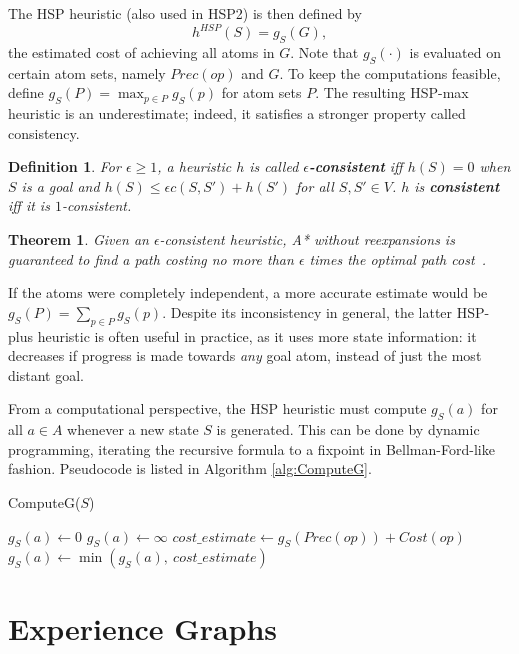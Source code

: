 \documentclass[letterpaper]{article}
\newtheorem{thm}{Theorem}
\newtheorem{defn}{Definition}
\begin{document}
The HSP heuristic (also used in HSP2) is then defined by
\[h^{HSP}(S) = g_S(G),\]
the estimated cost of achieving all atoms in $G$. Note that $g_S(\cdot)$ is evaluated on certain atom sets, namely $Prec(op)$ and $G$.
To keep the computations feasible, define $g_S(P) = \max_{p\in P} g_S(p)$ for atom sets $P$.
The resulting HSP-max heuristic is an underestimate; indeed, it satisfies a stronger property called consistency.

\begin{defn} For $\epsilon\ge 1$, a heuristic $h$ is called \textbf{$\epsilon$-consistent} iff $h(S) = 0$ when $S$ is a goal and $h(S) \le \epsilon c(S,S') + h(S')$ for all $S,S'\in V$. $h$ is \textbf{consistent} iff it is $1$-consistent. \end{defn}
\begin{thm} Given an $\epsilon$-consistent heuristic, A* without reexpansions is guaranteed to find a path costing no more than $\epsilon$ times the optimal path cost~\cite{LikGorThr-ara}. \end{thm}

If the atoms were completely independent, a more accurate estimate would be $g_S(P) = \sum_{p\in P} g_S(p)$.
Despite its inconsistency in general, the latter HSP-plus heuristic is often useful in practice, as it uses more state information: it decreases if progress is made towards \textit{any} goal atom, instead of just the most distant goal.

From a computational perspective, the HSP heuristic must compute $g_S(a)$ for all $a\in A$ whenever a new state $S$ is generated.
This can be done by dynamic programming, iterating the recursive formula to a fixpoint in Bellman-Ford-like fashion.
Pseudocode is listed in Algorithm \ref{alg:ComputeG}.

\begin{algorithm}
\caption{ComputeG($S$)}
\label{alg:ComputeG}
\begin{algorithmic}
\STATE $g_S(a) \leftarrow 0$
\ELSE
\STATE $g_S(a) \leftarrow \infty$
\ENDIF
\ENDFOR
\REPEAT
{}
\STATE $cost\_estimate \leftarrow g_S(Prec(op)) + Cost(op)$
\STATE $g_S(a) \leftarrow \min \left(g_S(a),~cost\_estimate\right)$
\ENDFOR
\ENDFOR
{}
\end{algorithmic}
\end{algorithm}

\section{Experience Graphs}
\end{document}
